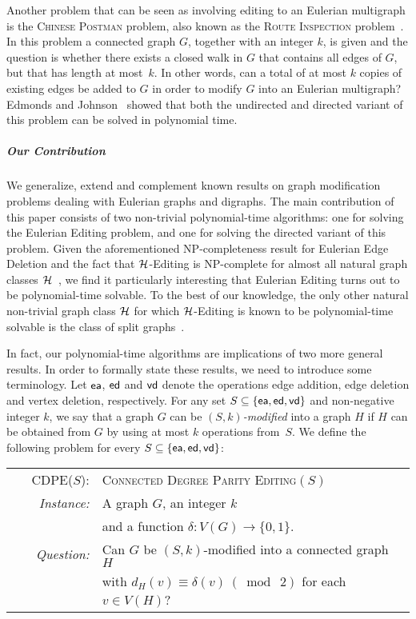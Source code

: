\documentclass[11pt]{llncs}
\newcommand{\vd}{{\sf vd}}
\newcommand{\ed}{{\sf ed}}
\newcommand{\ea}{{\sf ea}}
\newcommand{\cdpe}{{\sc CDPE}}
\newcommand{\NP}{{\sf NP}}
\begin{document}
Another problem that can be seen as involving editing to an Eulerian multigraph
is the \textsc{Chinese Postman} problem, also known as the \textsc{Route
Inspection} problem~\cite{Kwan62}. In this problem a connected graph $G$,
together with an integer $k$, is given and the question is whether there exists
a closed walk in $G$ that contains all edges of $G$, but that has length at
most~$k$. In other words, can a total of at most $k$ copies of existing edges
be added to $G$ in order to modify $G$ into an Eulerian multigraph? Edmonds and
Johnson~\cite{EdmondsJ73} showed that both the undirected and directed variant
of this problem can be solved in polynomial time.

\subparagraph{Our Contribution}
We generalize, extend and complement known results on graph modification
problems dealing with Eulerian graphs and digraphs. 
The main contribution of
this paper consists of two non-trivial polynomial-time algorithms: one for
solving the {\sc Eulerian Editing} problem, and one for solving the directed
variant of this problem.
Given the aforementioned \NP-completeness result
for {\sc Eulerian Edge Deletion} and the fact that ${\cal H}$-{\sc Editing} is
\NP-complete for almost all natural graph classes ${\cal
H}$~\cite{BurzynBD06,NatanzonSS01}, we find it particularly interesting that
{\sc Eulerian Editing} turns out to be polynomial-time solvable. To the best of
our knowledge, 
the only other natural 
non-trivial graph class ${\cal H}$ for which ${\cal
H}$-{\sc Editing} is known to be polynomial-time solvable is the class of split
graphs~\cite{HammerS81}.

In fact, our polynomial-time algorithms are implications of two more general
results. In order to formally state these results, we need to introduce some
terminology. Let $\ea$, $\ed$ and $\vd$ denote the operations edge addition,
edge deletion and vertex deletion, respectively. For any set $S\subseteq
\{\ea,\ed,\vd\}$ and non-negative integer $k$, we say that a graph $G$ can be
{\em $(S,k)$-modified} into a graph $H$ if $H$ can be obtained from $G$ by
using at most $k$ operations from~$S$. We define the following problem for
every $S\subseteq \{\ea,\ed,\vd\}$:
\begin{center}
\begin{boxedminipage}{.99\textwidth}
\begin{tabular}{rl}
\textsc{\cdpe($S$):} & \textsc{Connected Degree Parity Editing$(S)$}\\
\textit{~~~~Instance:} & A graph $G$, an integer $k$\\
                       & and a function $\delta\colon V(G)\rightarrow\{0,1\}$.\\
\textit{Question:} & Can $G$ be $(S,k)$-modified into a connected graph $H$\\ 
                   & with $d_{H}(v)\equiv\delta(v)~(\bmod~2)$ for each $v\in V(H)$?
                   \end{tabular}
\end{boxedminipage}
\end{center}
\end{document}
